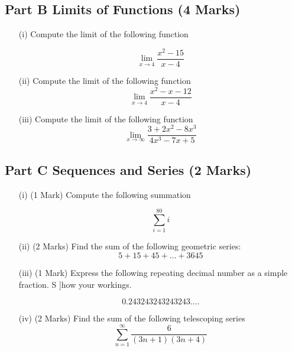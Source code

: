 \documentclass[11pt]{article} %
\begin{document}
\newpage
\subsection*{Part B Limits of Functions (4 Marks)}

\begin{enumerate}
	\item[(i)]  Compute the limit of the following function
	
	\[\lim_{x \to 4 } \frac{x^2-15}{x-4}\]
	\vspace{1.5cm}
	\item[(ii)]  Compute the limit of the following function
	\vspace{1.5cm}
	\[\lim_{x \to 4 } \frac{x^2-x-12}{x-4}\]
	\vspace{1.5cm}
	\item[(iii)]  Compute the limit of the following function
	\[ \lim_{x \to \infty } \frac{3 + 2x^2 - 8x^3 }{4x^3 - 7x + 5} \]	
	
\end{enumerate}
\newpage

\newpage
\subsection*{Part C Sequences and Series (2 Marks)}

\begin{enumerate}
	\item[(i)](1 Mark)  Compute the following summation
	
	\[ \sum_{i=1}^{80} i \]

	\vspace{5.5cm}
	\item[(ii)] (2 Marks) Find the sum of the following geometric series: 
		\[5 + 15 + 45 +  \ldots + 3645\]
		\newpage

	
	\item[(iii)] (1 Mark) Express the following repeating decimal number as a simple fraction. S
	]how your workings.
	
	\[0.243243243243243....\]
	\vspace{5.5cm}
	\item[(iv)] (2 Marks) Find the sum of the following telescoping series
		\[  \sum^{\infty}_{n=1}   \frac{6}{(3n+1)(3n+4)}  \]
		
\end{enumerate}
\end{document}
